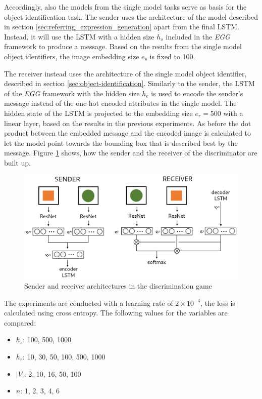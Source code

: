 Accordingly, also the models from the single model tasks serve as basis for the object identification task.
The sender uses the architecture of the model described in section \ref{sec:referring_expression_generation} apart from the final LSTM.
Instead, it will use the LSTM with a hidden size $h_s$ included in the \emph{EGG} framework to produce a message.
Based on the results from the single model object identifiers, the image embedding size $e_s$ is fixed to 100.

The receiver instead uses the architecture of the single model object identifier, described in section \ref{sec:object-identification}.
Similarly to the sender, the LSTM of the \emph{EGG} framework with the hidden size $h_e$ is used to encode the sender's message instead of the one-hot encoded attributes in the single model.
The hidden state of the LSTM is projected to the embedding size $e_r=500$ with a linear layer, based on the results in the previous experiments.
As before the dot product between the embedded message and the encoded image is calculated to let the model point towards the bounding box that is described best by the message.
Figure \ref{fig:discriminator_architecture} shows, how the sender and the receiver of the discriminator are built up.

\begin{figure}[ht]
    \centering
    \includegraphics[width=.8\linewidth]{figures/arch_discriminator.png}
    \caption{Sender and receiver architectures in the discrimination game}
    \label{fig:discriminator_architecture}
\end{figure}

The experiments are conducted with a learning rate of $2\times10^{-4}$, the loss is calculated using cross entropy.
The following values for the variables are compared:
\begin{itemize}
    \item $h_s$: 100, 500, 1000
    \item $h_r$: 10, 30, 50, 100, 500, 1000
    \item $|V|$: 2, 10, 16, 50, 100
    \item $n$: 1, 2, 3, 4, 6
\end{itemize}

